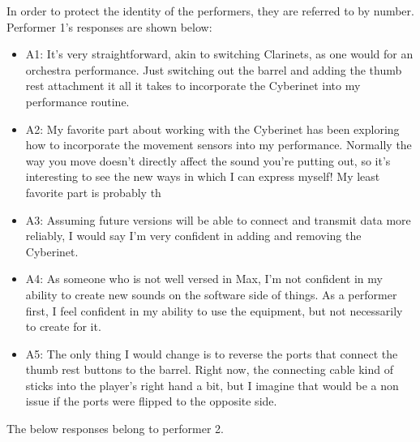 In order to protect the identity of the performers, they are referred to by number. Performer 1's responses are shown below: %

\begin{itemize}
    \item A1: It's very straightforward, akin to switching Clarinets, as one would for an orchestra performance. Just switching out the barrel and adding the thumb rest attachment it all it takes to incorporate the Cyberinet into my performance routine.
    \item A2: My favorite part about working with the Cyberinet has been exploring how to incorporate the movement sensors into my performance. Normally the way you move doesn't directly affect the sound you're putting out, so it's interesting to see the new ways in which I can express myself! My least favorite part is probably th
    \item A3: Assuming future versions will be able to connect and transmit data more reliably, I would say I'm very confident in adding and removing the Cyberinet.
    \item A4: As someone who is not well versed in Max, I'm not confident in my ability to create new sounds on the software side of things. As a performer first, I feel confident in my ability to use the equipment, but not necessarily to create for it.
    \item A5: The only thing I would change is to reverse the ports that connect the thumb rest buttons to the barrel. Right now, the connecting cable kind of sticks into the player's right hand a bit, but I imagine that would be a non issue if the ports were flipped to the opposite side.
\end{itemize}


The below responses belong to performer 2. %

